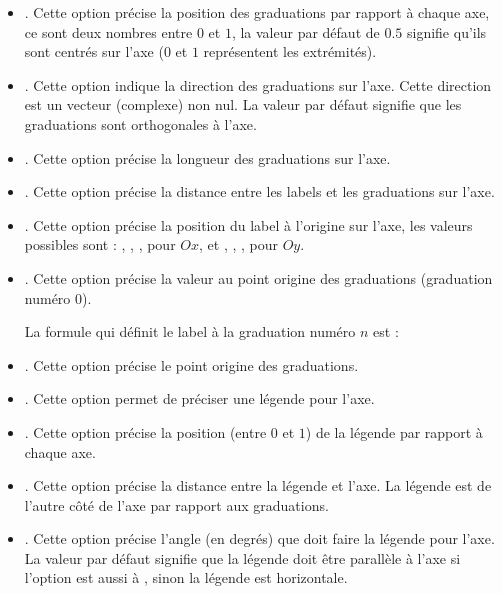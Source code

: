\begin{itemize}
\begin{itemize}
            \item {}. Cette option précise la position des graduations par rapport à chaque axe, ce sont deux nombres entre $0$ et $1$, la valeur par défaut de $0.5$ signifie qu'ils sont centrés sur l'axe ($0$ et $1$ représentent les extrémités).
            \item {}. Cette option indique la direction des graduations sur l'axe. Cette direction est un vecteur (complexe) non nul. La valeur par défaut  signifie que les graduations sont orthogonales à l'axe.
            \item {}. Cette option précise la longueur des graduations sur l'axe.
            \item {}. Cette option précise la distance entre les labels et les graduations sur l'axe.
            \item {}. Cette option précise la position du label à l'origine sur l'axe, les valeurs possibles sont : , , ,  pour $Ox$, et , , ,  pour $Oy$.
            
            \item {}. Cette option précise la valeur au point origine des graduations (graduation numéro $0$). 
            
            La formule qui définit le label à la graduation numéro $n$ est : 
            
            \item {}. Cette option précise le point origine des graduations.
            
            \item {}. Cette option permet de préciser une légende pour l'axe.
            \item {}. Cette option précise la position (entre $0$ et $1$) de la légende par rapport à chaque axe.
            
            \item {}. Cette option précise la distance entre la légende et l'axe. La légende est de l'autre côté de l'axe par rapport aux graduations.
            
            \item {}. Cette option précise l'angle (en degrés) que doit faire la légende pour l'axe. La valeur  par défaut signifie que la légende doit être parallèle à l'axe si l'option  est aussi à , sinon la légende est horizontale.
            

\end{itemize}
\end{itemize}
